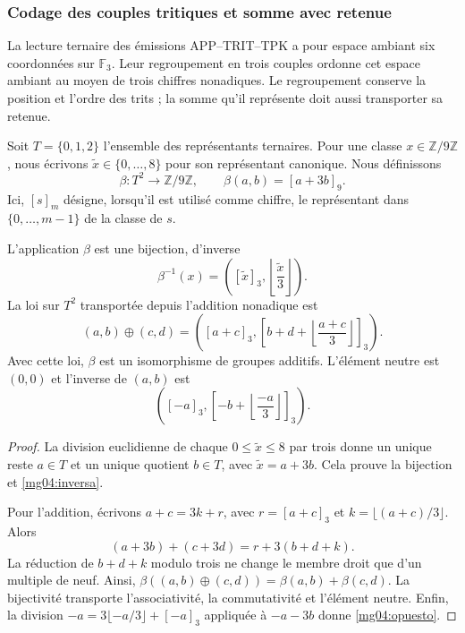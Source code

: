 \subsubsection{Codage des couples tritiques et somme avec retenue}
\label{mg04:codificacion}

La lecture ternaire des émissions APP--TRIT--TPK a pour espace ambiant
six coordonnées sur \(\mathbb F_3\). Leur regroupement en trois couples
ordonne cet espace ambiant au moyen de trois chiffres nonadiques. Le regroupement
conserve la position et l'ordre des trits ; la somme qu'il représente
doit aussi transporter sa retenue.

Soit \(T=\{0,1,2\}\) l'ensemble des représentants ternaires. Pour une classe \(x\in\mathbb Z/9\mathbb Z\), nous écrivons \(\widetilde x\in\{0,\ldots,8\}\) pour son représentant canonique. Nous définissons
\begin{equation}
 \beta:T^2\longrightarrow\mathbb Z/9\mathbb Z,
 \qquad \beta(a,b)=[a+3b]_9.
 \label{mg04:beta}
\end{equation}
Ici, \([s]_m\) désigne, lorsqu'il est utilisé comme chiffre, le représentant
dans \(\{0,\ldots,m-1\}\) de la classe de \(s\).

\begin{proposition}
L'application \(\beta\) est une bijection, d'inverse
\begin{equation}
 \beta^{-1}(x)=
 \left([\widetilde x]_3,
       \left\lfloor\frac{\widetilde x}{3}\right\rfloor\right).
 \label{mg04:inversa}
\end{equation}
La loi sur \(T^2\) transportée depuis l'addition nonadique est
\begin{equation}
 (a,b)\oplus(c,d)=
 \left([a+c]_3,
 \left[b+d+\left\lfloor\frac{a+c}{3}\right\rfloor\right]_3\right).
 \label{mg04:suma}
\end{equation}
Avec cette loi, \(\beta\) est un isomorphisme de groupes additifs.
L'élément neutre est \((0,0)\) et l'inverse de \((a,b)\) est
\begin{equation}
 \left([-a]_3,
 \left[-b+\left\lfloor\frac{-a}{3}\right\rfloor\right]_3\right).
 \label{mg04:opuesto}
\end{equation}
\end{proposition}

\begin{proof}
La division euclidienne de chaque \(0\leq\widetilde x\leq8\) par
trois donne un unique reste \(a\in T\) et un unique quotient \(b\in T\),
avec \(\widetilde x=a+3b\). Cela prouve la bijection et
\eqref{mg04:inversa}.

Pour l'addition, écrivons \(a+c=3k+r\), avec \(r=[a+c]_3\) et \(k=\lfloor(a+c)/3\rfloor\). Alors
\[
 (a+3b)+(c+3d)=r+3(b+d+k).
\]
La réduction de \(b+d+k\) modulo trois ne change le membre droit que d'un multiple de neuf. Ainsi, \(\beta((a,b)\oplus(c,d))=\beta(a,b)+\beta(c,d)\). La bijectivité transporte l'associativité, la commutativité et l'élément neutre. Enfin, la division \(-a=3\lfloor-a/3\rfloor+[-a]_3\) appliquée à \(-a-3b\) donne \eqref{mg04:opuesto}.
\end{proof}

